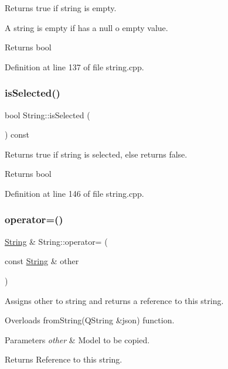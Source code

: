 Returns true if string is empty. 

A string is empty if has a null o empty value. \begin{DoxyReturn}{Returns}
bool 
\end{DoxyReturn}


Definition at line 137 of file string.\+cpp.

\mbox{\label{classString_a3f5ffd092dd9870ae281b2e08d3b69dd}} 
\subsubsection{\texorpdfstring{is\+Selected()}{isSelected()}}
{\footnotesize\ttfamily bool String\+::is\+Selected (\begin{DoxyParamCaption}{ }\end{DoxyParamCaption}) const}



Returns true if string is selected, else returns false. 

\begin{DoxyReturn}{Returns}
bool 
\end{DoxyReturn}


Definition at line 146 of file string.\+cpp.

\mbox{\label{classString_a734f34a0b7a42bcad30c368d6e8c5469}} 
\subsubsection{\texorpdfstring{operator=()}{operator=()}}
{\footnotesize\ttfamily \mbox{\hyperlink{classString}{String}} \& String\+::operator= (\begin{DoxyParamCaption}\item[{const \mbox{\hyperlink{classString}{String}} \&}]{other }\end{DoxyParamCaption})}



Assigns other to string and returns a reference to this string. 

Overloads from\+String(\+Q\+String \&json) function. 
\begin{DoxyParams}{Parameters}
{\em other} & Model to be copied. \\
\hline
\end{DoxyParams}
\begin{DoxyReturn}{Returns}
Reference to this string. 
\end{DoxyReturn}


